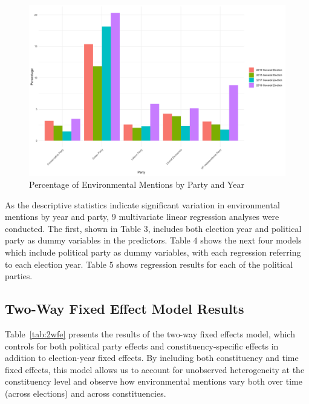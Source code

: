 \documentclass[preprint]{elsarticle} %
\begin{document}
\vspace{-1cm}
\begin{figure}[htbp]
	\centering
	\includegraphics[width=\textwidth, height=0.6\textheight, keepaspectratio]{env_mentions_percentage.png} %
	\caption{Percentage of Environmental Mentions by Party and Year}
	\label{fig:env_mentions_perc}
\end{figure}


\newpage

As the descriptive statistics indicate significant variation in environmental mentions by year and party, 9 multivariate linear regression analyses were conducted. The first, shown in Table 3, includes both election year and political party as dummy variables in the predictors. Table 4 shows the next four models which include political party as dummy variables, with each regression referring to each election year. Table 5 shows regression results for each of the political parties.



\subsection{Two-Way Fixed Effect Model Results}

Table~\ref{tab:2wfe} presents the results of the two-way fixed effects model, which controls for both political party effects and constituency-specific effects in addition to election-year fixed effects. By including both constituency and time fixed effects, this model allows us to account for unobserved heterogeneity at the constituency level and observe how environmental mentions vary both over time (across elections) and across constituencies.
\end{document}
